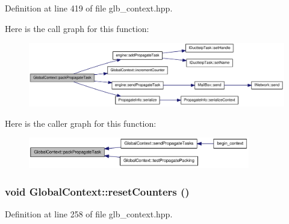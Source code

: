 Definition at line 419 of file glb\_\-context.hpp.

Here is the call graph for this function:\nopagebreak
\begin{figure}[H]
\begin{center}
\leavevmode
\includegraphics[width=362pt]{class_global_context_ab6ed24acc55b88a93b7498acbccf6141_cgraph}
\end{center}
\end{figure}


Here is the caller graph for this function:\nopagebreak
\begin{figure}[H]
\begin{center}
\leavevmode
\includegraphics[width=274pt]{class_global_context_ab6ed24acc55b88a93b7498acbccf6141_icgraph}
\end{center}
\end{figure}
\hypertarget{class_global_context_a35b48731e0ef7a63c7017b57fd6c95b1}{
\subsubsection[{resetCounters}]{\setlength{\rightskip}{0pt plus 5cm}void GlobalContext::resetCounters ()}}
\label{class_global_context_a35b48731e0ef7a63c7017b57fd6c95b1}


Definition at line 258 of file glb\_\-context.hpp.

